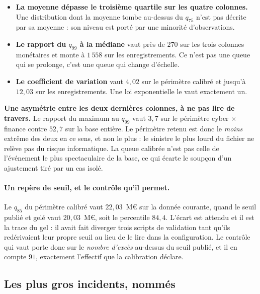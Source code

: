 \begin{itemize}[leftmargin=1.4em,itemsep=3pt]
\item \textbf{La moyenne dépasse le troisième quartile sur les quatre colonnes.} Une
      distribution dont la moyenne tombe au-dessus du $q_{75}$ n'est pas décrite par sa moyenne :
      son niveau est porté par une minorité d'observations.
\item \textbf{Le rapport du $q_{99}$ à la médiane} vaut près de $270$ sur les trois colonnes
      monétaires et monte à $1\,558$ sur les enregistrements. Ce n'est pas une queue qui se
      prolonge, c'est une queue qui change d'échelle.
\item \textbf{Le coefficient de variation} vaut $4{,}02$ sur le périmètre calibré et jusqu'à
      $12{,}03$ sur les enregistrements. Une loi exponentielle le vaut exactement un.
\end{itemize}


\begin{attention}
\textbf{Une asymétrie entre les deux dernières colonnes, à ne pas lire de travers.} Le rapport
du maximum au $q_{99}$ vaut $3{,}7$ sur le périmètre cyber $\times$ finance contre $52{,}7$ sur
la base entière. Le périmètre retenu est donc le \emph{moins} extrême des deux en ce sens, et non
le plus : le sinistre le plus lourd du fichier ne relève pas du risque informatique. La queue
calibrée n'est pas celle de l'événement le plus spectaculaire de la base, ce qui écarte le
soupçon d'un ajustement tiré par un cas isolé.
\end{attention}

\paragraph{Un repère de seuil, et le contrôle qu'il permet.} Le $q_{85}$ du périmètre calibré
vaut $22{,}03$~M\euro{} sur la donnée courante, quand le seuil publié et gelé vaut
$20{,}03$~M\euro, soit le percentile $84{,}4$. L'écart est attendu et il est la trace du gel : il
avait fait diverger trois scripts de validation tant qu'ils redérivaient leur propre seuil au
lieu de le lire dans la configuration. Le contrôle qui vaut porte donc sur le \emph{nombre
d'excès} au-dessus du seuil publié, et il en compte $91$, exactement l'effectif que la
calibration déclare.

\subsection{Les plus gros incidents, nommés}
\label{subsec:top-incidents}

